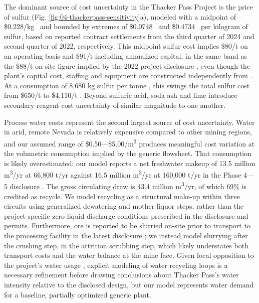 \documentclass{article}
\renewcommand\_{\textunderscore\allowbreak}
\begin{document}
The dominant source of cost uncertainty in the Thacker Pass Project is the price of sulfur (Fig. \ref{fig:04-thackerpass-sensitivity}a), modeled with a midpoint of \$0.228/kg~\cite{intratecSulfurPriceHistorical} and bounded by extremes of \$0.0748~\cite{mullinsTampaMoltenSulphur2024,usgeologicalsurveyMineralCommoditySummaries2025} and \$0.4734~\cite{usgeologicalsurveyMineralCommoditySummaries2023} per kilogram of sulfur, based on reported contract settlements from the third quarter of 2024 and second quarter of 2022, respectively. This midpoint sulfur cost implies \$80/t  on an operating basis and \$91/t
including annualized capital, in the same band as the \$88/t on-site figure implied by the 2022
project disclosure \citep{rothFeasibilityStudyNational2022}, even though the plant's capital cost,
staffing and equipment are constructed independently from~\cite{davenportSulfuricAcidManufacture2006,
ulrichGuideChemicalEngineering1984}. At a consumption of 8,680 kg sulfur per tonne , this swings the total sulfur cost from \$650/t  to \$4,110/t . Beyond sulfuric acid, soda ash and lime introduce secondary reagent cost uncertainty of similar magnitude to one another.

Process water costs represent the second largest source of cost uncertainty. Water in arid, remote Nevada is relatively expensive compared to other mining regions, and our assumed range of \$0.50---\$5.00/\si{m^3} produces meaningful cost variation at the volumetric consumption implied by the generic flowsheet. That consumption is likely overestimated: our model reports a net freshwater makeup of 13.5 million \si{m^3/yr} at 66,800 \si{t/yr} against 16.5 million \si{m^3/yr} at 160,000 \si{t/yr} in the Phase 4---5 disclosure \cite{sgscanadaincSK1300Technical2024}. The gross circulating draw is 43.4 million \si{m^3/yr}, of which 69\% is credited as recycle. We model recycling as a structural make-up within three circuits using generalized dewatering and mother liquor steps, rather than the project-specific zero-liquid discharge conditions prescribed in the disclosure and permits. Furthermore, ore is reported to be slurried on-site prior to transport to the processing facility in the latest disclosure \cite{sgscanadaincSK1300Technical2024}; we instead model slurrying after the crushing step, in the attrition scrubbing step, which likely understates both transport costs and the water balance at the mine face. Given local opposition to the project's water usage \cite{alonzoenvironmentQuestionsWaterRights2025}, explicit modeling of water recycling loops is a necessary refinement before drawing conclusions about Thacker Pass's water intensity relative to the disclosed design, but our model represents water demand for a baseline, partially optimized generic plant.
\end{document}
